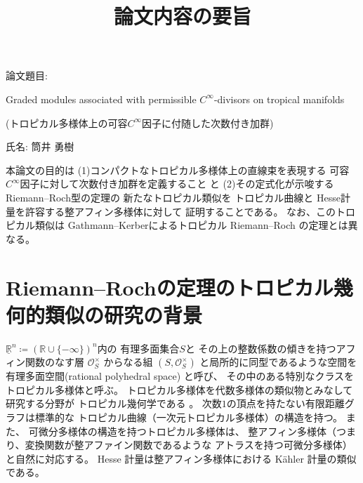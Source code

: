 \documentclass[uplatex,dvipdfmx,12pt]{jsarticle}
\title{論文内容の要旨
}
\date{}
\numberwithin{equation}{section}
\theoremstyle{definition}
\newcommand{\deq}{\coloneqq}
\newcommand{\beforesection}{\vspace{-15pt}}
\newcommand{\aftersection}{\vspace{-8pt}}
\begin{document}
\setlength{\baselineskip}{-5pt}
\setlength{\parskip}{2pt}


\maketitle
{\large
\noindent
論文題目:

Graded modules associated 
with permissible $C^{\infty}$-divisors on tropical manifolds

(トロピカル多様体上の可容$C^{\infty}$因子に付随した次数付き加群)
}

\vspace{5pt}

\noindent
{\large
氏名: 筒井 勇樹
}

\vspace{10pt}

\setlength{\baselineskip}{4pt}
\setlength{\parskip}{3pt}

本論文の目的は
(1)コンパクトなトロピカル多様体上の直線束を表現する
可容$C^{\infty}$因子に対して次数付き加群を定義すること
と
(2)その定式化が示唆するRiemann--Roch型の定理の
新たなトロピカル類似を
トロピカル曲線と
Hesse計量を許容する整アフィン多様体に対して
証明することである。
なお、このトロピカル類似は
Gathmann--Kerberによるトロピカル Riemann--Roch の定理とは異なる。

\beforesection

\section{Riemann--Rochの定理のトロピカル幾何的類似の研究の背景}

\aftersection

$\underline{\mathbb{R}}^{n} \deq (\mathbb{R}\cup\{-\infty\})^{n}$内の
有理多面集合$S$と
その上の整数係数の傾きを持つアフィン関数のなす層 
$\mathcal{O}_S^{\times}$
からなる組
$(S, \mathcal{O}_S^{\times})$
と局所的に同型であるような空間を
有理多面空間(rational polyhedral space)
と呼び、
その中のある特別なクラスをトロピカル多様体と呼ぶ。
トロピカル多様体を代数多様体の類似物とみなして研究する分野が
トロピカル幾何学である
\cite{mikhalkinTropicalEigenwaveIntermediate2014a,
gross2019sheaftheoretic}。
次数$1$の頂点を持たない有限距離グラフは標準的な
トロピカル曲線（一次元トロピカル多様体）の構造を持つ。
また、
可微分多様体の構造を持つトロピカル多様体は、
整アフィン多様体（つまり、変換関数が整アファイン関数であるような
アトラスを持つ可微分多様体）と自然に対応する。
Hesse 計量は整アフィン多様体における
K\"ahler 計量の類似である。
\end{document}
